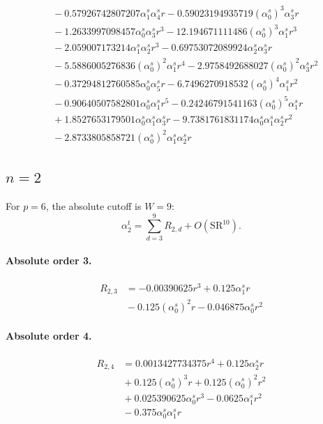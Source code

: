 \documentclass[10pt]{article}
\begin{document}
\begin{align*}
&{}  - 0.57926742807207 \alpha_{1}^s \alpha_{4}^s r - 0.59023194935719 \left(\alpha_{0}^s\right)^{3} \alpha_{3}^s r \\
&{}  - 1.2633997098457 \alpha_{0}^s \alpha_{3}^s r^{3} - 12.194671111486 \left(\alpha_{0}^s\right)^{3} \alpha_{1}^s r^{3} \\
&{}  - 2.059007173214 \alpha_{1}^s \alpha_{2}^s r^{3} - 0.69753072089924 \alpha_{2}^s \alpha_{3}^s r \\
&{}  - 5.5886005276836 \left(\alpha_{0}^s\right)^{2} \alpha_{1}^s r^{4} - 2.9758492688027 \left(\alpha_{0}^s\right)^{2} \alpha_{3}^s r^{2} \\
&{}  - 0.37294812760585 \alpha_{0}^s \alpha_{5}^s r - 6.7496270918532 \left(\alpha_{0}^s\right)^{4} \alpha_{1}^s r^{2} \\
&{}  - 0.90640507582801 \alpha_{0}^s \alpha_{1}^s r^{5} - 0.24246791541163 \left(\alpha_{0}^s\right)^{5} \alpha_{1}^s r \\
&{}  + 1.8527653179501 \alpha_{0}^s \alpha_{1}^s \alpha_{3}^s r - 9.7381761831174 \alpha_{0}^s \alpha_{1}^s \alpha_{2}^s r^{2} \\
&{}  - 2.8733805858721 \left(\alpha_{0}^s\right)^{2} \alpha_{1}^s \alpha_{2}^s r
\end{align*}

\subsection{$n=2$}
For $p=6$, the absolute cutoff is $W=9$:
\[\alpha_{2}^t=\sum_{d=3}^{9}R_{2,d}+O(\mathrm{SR}^{10}).\]
\paragraph{Absolute order 3.}
\begin{align*}
R_{2,3} &=  - 0.00390625 r^{3} + 0.125 \alpha_{1}^s r \\
&{}  - 0.125 \left(\alpha_{0}^s\right)^{2} r - 0.046875 \alpha_{0}^s r^{2}
\end{align*}

\paragraph{Absolute order 4.}
\begin{align*}
R_{2,4} &= 0.0013427734375 r^{4} + 0.125 \alpha_{2}^s r \\
&{}  + 0.125 \left(\alpha_{0}^s\right)^{3} r + 0.125 \left(\alpha_{0}^s\right)^{2} r^{2} \\
&{}  + 0.025390625 \alpha_{0}^s r^{3} - 0.0625 \alpha_{1}^s r^{2} \\
&{}  - 0.375 \alpha_{0}^s \alpha_{1}^s r
\end{align*}
\end{document}
